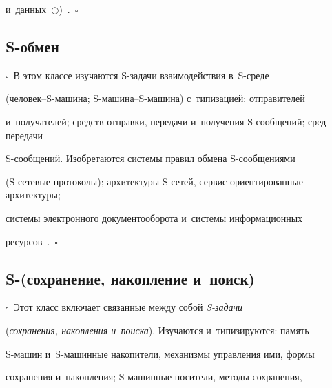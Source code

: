 и~данных~$\bigcirc$)~\cite{1-il, 2-il}.~$\square$





\vspace*{-6pt}


  


  \subsection{S-обмен}





$\square$~В этом классе изучаются S-задачи взаимодействия в~S-среде 


 (че\-ло\-век--S-ма\-ши\-на; S-ма\-ши\-на--S-ма\-ши\-на) с~типизацией: отправителей 


и~получателей; средств отправки, передачи и~получения S-со\-об\-ще\-ний; сред передачи  


S-со\-об\-ще\-ний. Изобретаются сис\-те\-мы правил обмена S-со\-об\-ще\-ни\-ями  


(S-се\-те\-вые протоколы); архитектуры S-се\-тей, сер\-вис-ори\-ен\-ти\-ро\-ван\-ные архитектуры; 


сис\-те\-мы электронного документооборота и~сис\-те\-мы информационных  


ресурсов~\cite{1-il, 2-il}.~$\square$ 





\vspace*{-6pt}





  \subsection{S-(сохранение, накопление и~поиск)}





  $\square$~Этот класс включает связанные меж\-ду собой \textit{S-за\-да\-чи} 


(\textit{со\-хра\-не\-ния, на\-коп\-ле\-ния и~поиска}). Изуча\-ют\-ся и~типизируются: память 


S-ма\-шин и~S-ма\-шин\-ные накопители, механизмы управ\-ле\-ния ими, формы 


со\-хра\-не\-ния и~на\-коп\-ле\-ния; \mbox{S-ма}\-шин\-ные носители, методы со\-хра\-не\-ния, 


